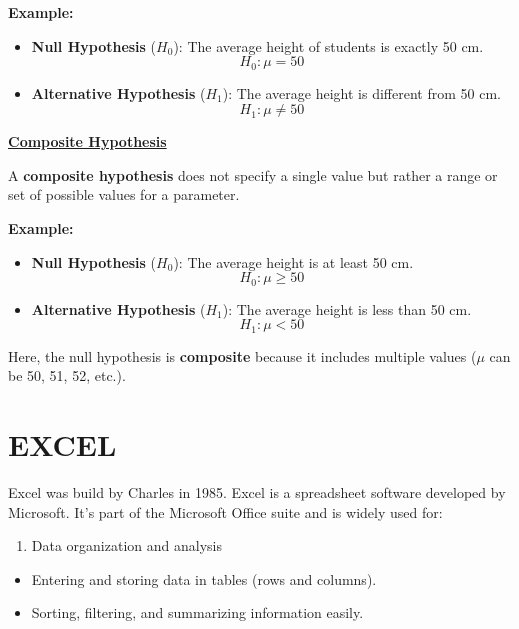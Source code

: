 \documentclass[
]{article}
\providecommand{\tightlist}{%
  \setlength{\itemsep}{0pt}\setlength{\parskip}{0pt}}
\begin{document}
\textbf{Example:}

\begin{itemize}
\item
  \textbf{Null Hypothesis} (\(H_0\)): The average height of students is
  exactly 50 cm.\\
  \[
  H_0: \mu = 50
  \]
\item
  \textbf{Alternative Hypothesis} (\(H_1\)): The average height is
  different from 50 cm.\\
  \[
  H_1: \mu \neq 50
  \]
\end{itemize}

\ul{\textbf{Composite Hypothesis}}

A \textbf{composite hypothesis} does not specify a single value but
rather a range or set of possible values for a parameter.

\textbf{Example:}

\begin{itemize}
\item
  \textbf{Null Hypothesis} (\(H_0\)): The average height is at least 50
  cm.\\
  \[
  H_0: \mu \geq 50
  \]
\item
  \textbf{Alternative Hypothesis} (\(H_1\)): The average height is less
  than 50 cm.\\
  \[
  H_1: \mu < 50
  \]
\end{itemize}

Here, the null hypothesis is \textbf{composite} because it includes
multiple values (\(\mu\) can be 50, 51, 52, etc.).

\newpage

\section{EXCEL}\label{excel}

Excel was build by Charles in 1985. Excel is a spreadsheet software
developed by Microsoft. It's part of the Microsoft Office suite and is
widely used for:

\begin{enumerate}
\def\labelenumi{\arabic{enumi}.}
\tightlist
\item
  Data organization and analysis
\end{enumerate}

\begin{itemize}
\item
  Entering and storing data in tables (rows and columns).
\item
  Sorting, filtering, and summarizing information easily.
\end{itemize}
\end{document}
